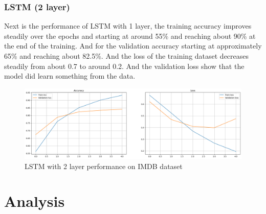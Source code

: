 \documentclass[12pt,a4paper]{article}
\begin{document}
\subsubsection{LSTM (2 layer)}
Next is the performance of LSTM with 1 layer, the training accuracy improves steadily over the epochs and starting at around 55\% and reaching about 90\% at the end of the training. And for the validation accuracy starting at approximately 65\% and reaching about 82.5\%. And the loss of the training dataset decreases steadily from about 0.7 to around 0.2. And the validation loss show that the model did learn something from the data. 
\begin{figure}[h!]
    \centering
    \includegraphics[width=1\textwidth]{../Pic/lstm2performance.png}
    \caption{LSTM with 2 layer performance on IMDB dataset}
\end{figure}

\newpage
\section{Analysis}
\end{document}
